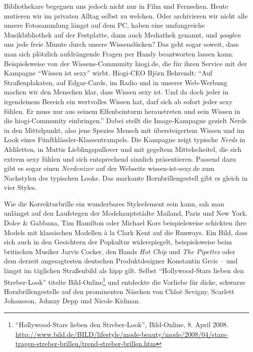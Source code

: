 \documentclass[output=paper]{langscibook}
\begin{document}
Bibliothekare begegnen uns jedoch nicht nur in Film und Fernsehen. Heute
mutieren wir im privaten Alltag selbst zu welchen. Oder archivieren wir
nicht alle unsere Fotosammlung längst auf dem PC, haben eine
umfangreiche Musikbibliothek auf der Festplatte, dann auch Mediathek
genannt, und \emph{googlen} uns jede freie Minute durch unsere
Wissenslücken? Das geht sogar soweit, dass man sich plötzlich
aufdrängende Fragen per Handy beantworten lassen kann. Beispielsweise
von der Wissens-Community hiogi.de, die für ihren Service mit der
Kampagne ``Wissen ist sexy'' wirbt. Hiogi-CEO Björn Behrendt: ``Auf
Straßenplakaten, auf Edgar-Cards, im Radio und in unserer Web-Werbung
machen wir den Menschen klar, dass Wissen sexy ist. Und da doch jeder in
irgendeinem Bereich ein wertvolles Wissen hat, darf sich ab sofort jeder
sexy fühlen. Er muss nur aus seinem Elfenbeinturm heraustreten und sein
Wissen in die hiogi-Community einbringen.'' Dabei stellt die
Image-Kampagne gezielt Nerds in den Mittelpunkt, also jene Spezies
Mensch mit übersteigertem Wissen und im Look eines
Fünftklässler-Klassentrampels. Die Kampagne zeigt typische \emph{Nerds}
in Aldiletten, in Muttis Lieblingspullover und mit gegeltem
Mittelscheitel, die sich extrem sexy fühlen und sich entsprechend
sinnlich präsentieren. Passend dazu gibt es sogar einen
\emph{Nerdenizer} auf der Webseite wissen-ist-sexy.de zum Nachstylen des
typischen Looks. Das markante Hornbrillengestell gibt es gleich in vier
Styles.

Wie die Korrekturbrille ein wunderbares Styleelement sein kann, sah man
unlängst auf den Laufstegen der Modehauptstädte Mailand, Paris und New
York. Dolce \& Gabbana, Tim Hamilton oder Michael Kors beispielsweise
schickten ihre Models mit klassischen Modellen à la Clark Kent auf die
Runways. Ein Bild, dass sich auch in den Gesichtern der Popkultur
widerspiegelt, beispielsweise beim britischen Musiker Jarvis Cocker, den
Bands \emph{Hot Chip} und \emph{The Pipettes} oder dem derzeit
angesagtesten deutschen Produktdesigner Konstantin Grcic -- und längst
im täglichen Straßenbild als hipp gilt. Selbst ``Hollywood-Stars lieben
den Streber-Look'' titelte Bild-Online\footnote{``Hollywood-Stars lieben
  den Streber-Look'', Bild-Online, 8. April 2008.
  \url{http://www.bild.de/BILD/lifestyle/mode-beauty/mode/2008/04/stars-tragen-streber-brillen/trend-streber-brillen.htm}}
und entdeckte die Vorliebe für dicke, schwarze Hornbrillengestelle auf
den prominenten Näschen von Chloë Sevigny, Scarlett Johansson, Johnny
Depp und Nicole Kidman.
\end{document}
